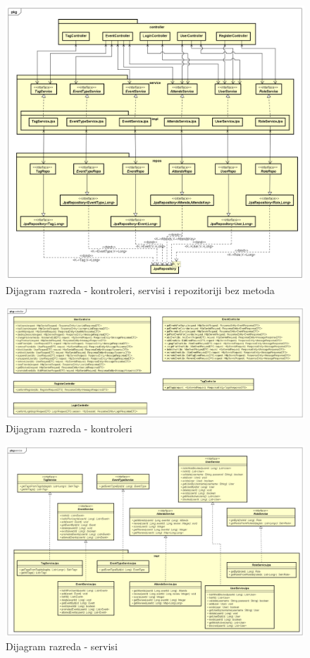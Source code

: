 			\begin{figure}[H]
				\includegraphics[width=\textwidth]{dijagrami/Razredni/Controller - Service - Repo SIMPLE.png}
				\caption{Dijagram razreda - kontroleri, servisi i repozitoriji bez metoda}
			\end{figure}
		
			\begin{figure}[H]
				\includegraphics[width=\textwidth]{dijagrami/Razredni/Controller.png}
				\caption{Dijagram razreda - kontroleri}
			\end{figure}
		
			\begin{figure}[H]
				\includegraphics[width=\textwidth]{dijagrami/Razredni/Service.png}
				\caption{Dijagram razreda - servisi}
			\end{figure}
		
